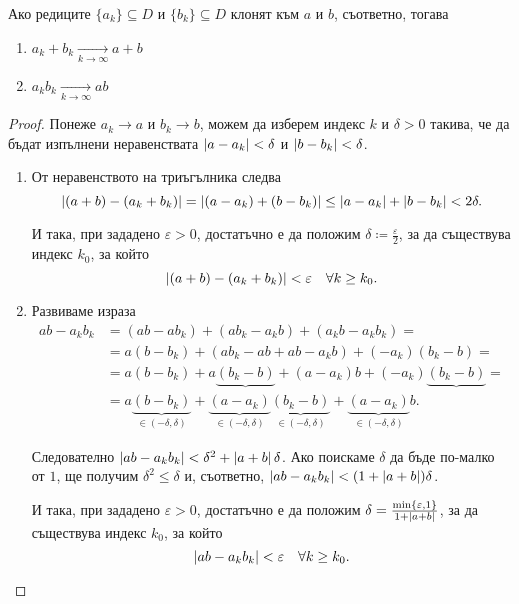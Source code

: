 \documentclass[numbers=endperiod, bibliography=totocnumbered]{scrartcl}
\begin{document}
\begin{proposition}\label{thm:limits_of_elementwise_sums_and_products}
  Ако редиците \( \{ a_k \} \subseteq D \) и \( \{ b_k \} \subseteq D \) клонят към \( a \) и \( b \), съответно, тогава
  \begin{enumerate}
    \item \( a_k + b_k \xrightarrow[k \to \infty]{} a + b \)
    \item \( a_k b_k \xrightarrow[k \to \infty]{} a b \)
  \end{enumerate}
\end{proposition}
\begin{proof}
  Понеже \( a_k \to a \) и \( b_k \to b \), можем да изберем индекс \( k \) и \( \delta > 0 \) такива, че да бъдат изпълнени неравенствата \( \left\vert a - a_k \right\vert < \delta \) и \( \left\vert b - b_k \right\vert < \delta \).

  \begin{enumerate}
    \item От неравенството на триъгълника следва
    \begin{equation*}
      \left\vert (a + b) - (a_k + b_k) \right\vert
      =
      \left\vert (a - a_k) + (b - b_k) \right\vert
      \leq
      \left\vert a - a_k \right\vert + \left\vert b - b_k \right\vert
      <
      2\delta.
    \end{equation*}

    И така, при зададено \( \varepsilon > 0 \), достатъчно е да положим \( \delta \coloneqq \tfrac \varepsilon 2 \), за да съществува индекс \( k_0 \), за който
    \begin{equation*}
      \left\vert (a + b) - (a_k + b_k) \right\vert < \varepsilon \quad\forall k \geq k_0.
    \end{equation*}

    \item Развиваме израза
    \begin{align*}
      ab - a_k b_k
      &=
      (ab - a b_k) + (a b_k - a_k b) + (a_k b - a_k b_k)
      = \\ &=
      a (b - b_k) + (a b_k - ab + ab - a_k b) + (-a_k)(b_k - b)
      = \\ &=
      a (b - b_k) + a \underbrace{(b_k - b)} + (a - a_k) b + (-a_k)\underbrace{(b_k - b)}
      = \\ &=
      a \underbrace{(b - b_k)}_{\in (-\delta, \delta)} + \underbrace{(a - a_k)}_{\in (-\delta, \delta)} \underbrace{(b_k - b)}_{\in (-\delta, \delta)} + \underbrace{(a - a_k)}_{\in (-\delta, \delta)} b.
    \end{align*}

    Следователно \( \left\vert ab - a_k b_k \right\vert < \delta^2 + \left\vert a + b \right\vert \delta \). Ако поискаме \( \delta \) да бъде по-малко от \( 1 \), ще получим \( \delta^2 \leq \delta \) и, съответно, \( \left\vert ab - a_k b_k \right\vert < (1 + \left\vert a + b \right\vert) \delta \).

    И така, при зададено \( \varepsilon > 0 \), достатъчно е да положим \( \delta = \tfrac {\min \{\varepsilon, 1 \}} {1 + \left\vert a + b \right\vert} \), за да съществува индекс \( k_0 \), за който
    \begin{equation*}
      \left\vert ab - a_k b_k \right\vert < \varepsilon \quad\forall k \geq k_0.
    \end{equation*}
  \end{enumerate}
\end{proof}
\end{document}
